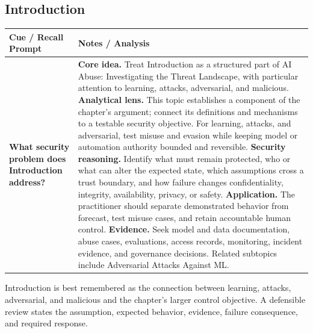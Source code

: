 \documentclass[11pt]{article}
\newcommand{\CornellHeader}{%
\rowcolor{Navy}\color{white}\bfseries Cue / Recall Prompt & \color{white}\bfseries Notes / Analysis\\\hline}
\newcommand{\CornellRow}[2]{%
\cellcolor{CueGray}\RaggedRight\textbf{#1} & \RaggedRight #2\\\hline}
\begin{document}
\subsection*{Introduction}
\begin{longtable}{>{\RaggedRight\arraybackslash}p{}|>{\RaggedRight\arraybackslash}p{}}
\CornellHeader
\CornellRow{What security problem does Introduction address?}{\textbf{Core idea.} Treat Introduction as a structured part of AI Abuse: Investigating the Threat Landscape, with particular attention to learning, attacks, adversarial, and malicious. \textbf{Analytical lens.} This topic establishes a component of the chapter's argument; connect its definitions and mechanisms to a testable security objective. For learning, attacks, and adversarial, test misuse and evasion while keeping model or automation authority bounded and reversible. \textbf{Security reasoning.} Identify what must remain protected, who or what can alter the expected state, which assumptions cross a trust boundary, and how failure changes confidentiality, integrity, availability, privacy, or safety. \textbf{Application.} The practitioner should separate demonstrated behavior from forecast, test misuse cases, and retain accountable human control. \textbf{Evidence.} Seek model and data documentation, abuse cases, evaluations, access records, monitoring, incident evidence, and governance decisions. Related subtopics include Adversarial Attacks Against ML.}
\end{longtable}
\begin{topicsummary}
Introduction is best remembered as the connection between learning, attacks, adversarial, and malicious and the chapter's larger control objective. A defensible review states the assumption, expected behavior, evidence, failure consequence, and required response.
\end{topicsummary}
\end{document}

